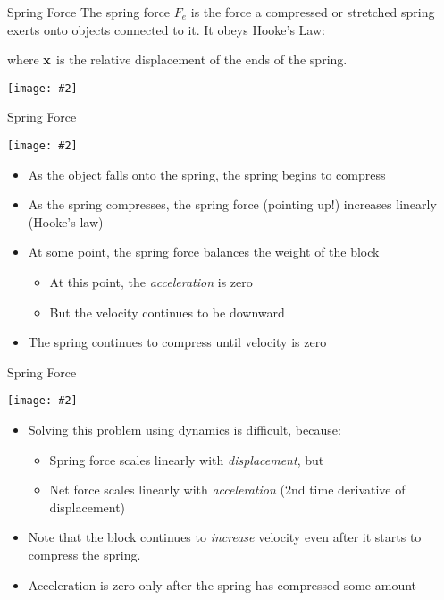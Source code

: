 \documentclass[12pt,compress,aspectratio=169]{beamer}
\newcommand{\pic}[2]{\texttt{[image: \#2]}}
\newcommand{\mb}[1]{\ensuremath\mathbf{#1}}
\newcommand{\eq}[2]{\vspace{#1}{\Large\begin{displaymath}#2\end{displaymath}}}
\begin{document}
\begin{frame}{Spring Force}
  The spring force $F_e$ is the force a compressed or stretched spring
  exerts onto objects connected to it. It obeys Hooke's Law:
  
  \eq{-.2in}{
    \mb{F}_e=-k\mb{x}
  }
  where $\mb{x}$ is the relative displacement of the ends of the spring.
  \begin{center}
    \pic{.35}{graphics/spring-example1}
  \end{center}
\end{frame}


\begin{frame}{Spring Force}
  \begin{center}
    \pic{.28}{graphics/spring-example1}
  \end{center}
  \begin{itemize}
  \item\vspace{-.15in}As the object falls onto the spring, the spring begins to
    compress
  \item As the spring compresses, the spring force (pointing up!) increases
    linearly (Hooke's law)
  \item At some point, the spring force balances the weight of the block
    \begin{itemize}
    \item At this point, the \emph{acceleration} is zero
    \item But the velocity continues to be downward
    \end{itemize}
  \item The spring continues to compress until velocity is zero
  \end{itemize}
\end{frame}



\begin{frame}{Spring Force}
  \begin{center}
    \pic{.28}{graphics/spring-example1}
  \end{center}
  \begin{itemize}
  \item\vspace{-.15in}Solving this problem using dynamics is difficult, because:
    \begin{itemize}
    \item Spring force scales linearly with \emph{displacement}, but
    \item Net force scales linearly with \emph{acceleration} (2nd time
      derivative of displacement)
    \end{itemize}
  \item Note that the block continues to \emph{increase} velocity even after
    it starts to compress the spring.
  \item Acceleration is zero only after the spring has compressed some amount
  \end{itemize}
\end{frame}
\end{document}
